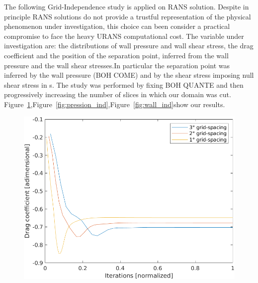 \documentclass[12pt]{article}
\begin{document}
The following Grid-Independence study is applied on RANS solution.   Despite in principle RANS solutions do not provide a trustful representation of the physical phenomenon under investigation, this choice can been consider a practical compromise to face the heavy URANS  computational cost. The variable under investigation are:  the distributions of wall pressure and wall shear stress, the drag coefficient and the position of the separation point, inferred from the wall pressure and the wall shear stresses.In particular the separation point was inferred by the wall pressure (BOH COME) and by the shear stress imposing null shear stress in s.
The study was performed by fixing BOH QUANTE and then progressively increasing the number of slices in which our domain was cut.
Figure~\ref{fig:drag_independence},Figure~\ref{fig:pression_ind},Figure~\ref{fig:wall_ind}show our results.
        \begin{figure}[!ht]
                \includegraphics[width=\textwidth]{DragCoefficient_Independence.png}
                \centering
                \caption{}
                \label{fig:drag_independence}
        \end{figure}
\end{document}
